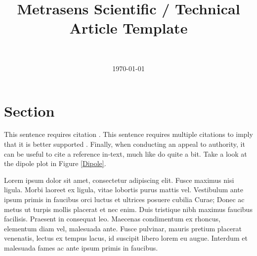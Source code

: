 \documentclass[10pt, a4paper, twocolumn]{article} %
\title{Metrasens Scientific / Technical Article Template} %
\author{
	\authorstyle{Richard Hodgskin-Brown} %
	\newline\newline %
	\metdisclaimer{Commercial in Confidence $|$ \copyright \ Metrasens Ltd. 2022}\\ %
}
\date{\today} %
\begin{document}
\maketitle %

\thispagestyle{firstpage} %




\section{Section}

This sentence requires citation \parencite{Reference1}. This sentence requires multiple citations to imply that it is better supported \parencite{Reference2,Reference3}. Finally, when conducting an appeal to authority, it can be useful to cite a reference in-text, much like \cite{Reference1} do quite a bit. Take a look at the dipole plot in Figure \ref{Dipole}.


Lorem ipsum dolor sit amet, consectetur adipiscing elit. Fusce maximus nisi ligula. Morbi laoreet ex ligula, vitae lobortis purus mattis vel. Vestibulum ante ipsum primis in faucibus orci luctus et ultrices posuere cubilia Curae; Donec ac metus ut turpis mollis placerat et nec enim. Duis tristique nibh maximus faucibus facilisis. Praesent in consequat leo. Maecenas condimentum ex rhoncus, elementum diam vel, malesuada ante. Fusce pulvinar, mauris pretium placerat venenatis, lectus ex tempus lacus, id suscipit libero lorem eu augue. Interdum et malesuada fames ac ante ipsum primis in faucibus.
\end{document}
